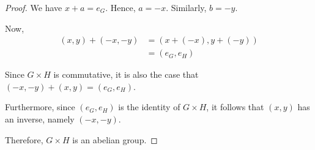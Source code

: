 \documentclass{article}
\begin{document}
\begin{proof}
We have $x+a=e_G$. Hence, $a=-x$. Similarly, $b=-y$.

Now,
\begin{align*}
(x,y)+(-x,-y)&=(x+(-x),y+(-y))\\
&=(e_G,e_H)
\end{align*}

Since $G \times H$ is commutative, it is also the case that
$(-x,-y)+(x,y)=(e_G,e_H)$.

Furthermore, since $(e_G,e_H)$ is the identity of $G \times H$, it follows
that $(x,y)$ has an inverse, namely $(-x,-y)$.

Therefore, $G \times H$ is an abelian group.
\end{proof}
\end{document}
